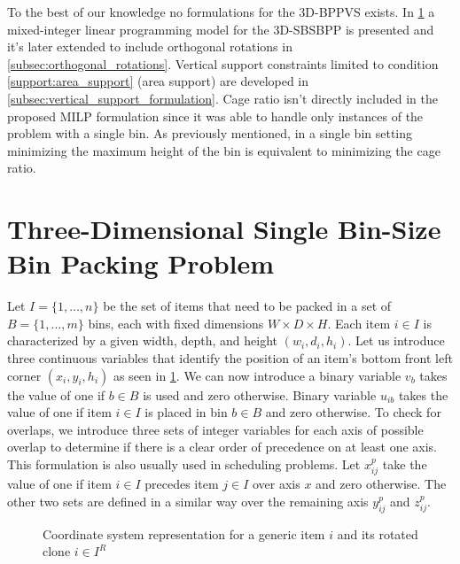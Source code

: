To the best of our knowledge no formulations for the 3D-BPPVS exists.
In \cref{sec:milp} a mixed-integer linear programming model for the 3D-SBSBPP is presented and it's later extended to include orthogonal rotations in \cref{subsec:orthogonal_rotations}.
Vertical support constraints limited to condition \ref{support:area_support} (area support) are developed in \cref{subsec:vertical_support_formulation}.
Cage ratio isn't directly included in the proposed MILP formulation since it was able to handle only instances of the problem with a single bin.
As previously mentioned, in a single bin setting minimizing the maximum height of the bin is equivalent to minimizing the cage ratio.

\section{Three-Dimensional Single Bin-Size Bin Packing Problem}
\label{sec:milp}%
Let $I = \{1,\dots, n \}$ be the set of items that need to be packed in a set of $B = \{1,\dots, m \}$ bins, each with fixed dimensions $W \times D \times H$.
Each item $i \in I$ is characterized by a given width, depth, and height $(w_i, d_i, h_i)$.
Let us introduce three continuous variables that identify the position of an item's bottom front left corner $(x_i, y_i, h_i)$ as seen in \cref{fig:coordinate_system}.
We can now introduce a binary variable $v_{b}$ takes the value of one if $b \in B$ is used and zero otherwise. Binary variable $u_{ib}$ takes the value of one if item $i \in I$ is placed in bin $b \in B$ and zero otherwise.
To check for overlaps, we introduce three sets of integer variables for each axis of possible overlap to determine if there is a clear order of precedence on at least one axis. This formulation is also usually used in scheduling problems.
Let $x^p_{ij}$ take the value of one if item $i \in I$ precedes item $j \in I$ over axis $x$ and zero otherwise.
The other two sets are defined in a similar way over the remaining axis $y^p_{ij}$ and $z^p_{ij}$.

\begin{figure}
    \scalebox{0.62}{%
    
    }
    \caption{Coordinate system representation for a generic item $i$ and its rotated clone $i \in I^R$}
    \label{fig:coordinate_system}
\end{figure}

